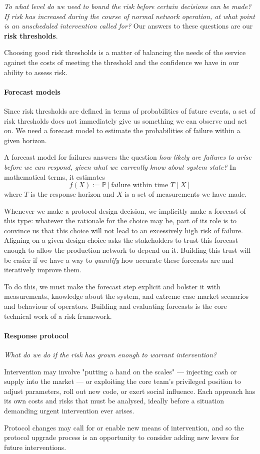 \emph{To what level do we need to bound the risk before certain decisions can be made? If risk has increased during the course of normal network operation, at what point is an unscheduled intervention called for?} Our answers to these questions are our \textbf{risk thresholds}.

Choosing good risk thresholds is a matter of balancing the needs of the service against the costs of meeting the threshold and the confidence we have in our ability to assess risk.

\paragraph{Forecast models}

Since risk thresholds are defined in terms of probabilities of future events, a set of risk thresholds does not immediately give us something we can observe and act on. We need a forecast model to estimate the probabilities of failure within a given horizon.

A forecast model for failures answers the question \emph{how likely are failures to arise before we can respond, given what we currently know about system state?} 
%
In mathematical terms, it estimates
%
\[
  f(X) := \mathbb{P}[\text{failure within time }T \mid X]
\]
%
where $T$ is the response horizon and $X$ is a set of measurements we have made.

Whenever we make a protocol design decision, we implicitly make a forecast of this type: whatever the rationale for the choice may be, part of its role is to convince us that this choice will not lead to an excessively high risk of failure.
%
Aligning on a given design choice asks the stakeholders to trust this forecast enough to allow the production network to depend on it.
%
Building this trust will be easier if we have a way to \emph{quantify} how accurate these forecasts are and iteratively improve them.

To do this, we must make the forecast step explicit and bolster it with measurements, knowledge about the system, and extreme case market scenarios and behaviour of operators.
%
Building and evaluating forecasts is the core technical work of a risk framework.

\paragraph{Response protocol}

\emph{What do we do if the risk has grown enough to warrant intervention?}

Intervention may involve "putting a hand on the scales" — injecting cash or supply into the market — or exploiting the core team's privileged position to adjust parameters, roll out new code, or exert social influence. 
%
Each approach has its own costs and risks that must be analysed, ideally before a situation demanding urgent intervention ever arises.

Protocol changes may call for or enable new means of intervention, and so the protocol upgrade process is an opportunity to consider adding new levers for future interventions.
